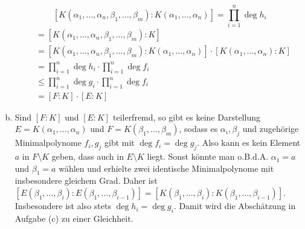 \documentclass{article}
\begin{document}
\begin{enumerate}[(a)]
\[            [K(\alpha_1,\dots, \alpha_n, \beta_1, \dots, \beta_m) \colon K(\alpha_1,\dots, \alpha_n)] = \prod_{i=1}^n \deg h_i
        \]
        \begin{align*}
            [EF \colon K] &= [K(\alpha_1,\dots, \alpha_n, \beta_1, \dots, \beta_m) \colon K]\\
            &= [K(\alpha_1,\dots, \alpha_n, \beta_1, \dots, \beta_m) \colon K(\alpha_1,\dots, \alpha_n)] \cdot [K(\alpha_1,\dots, \alpha_n):K]\\
            &=  \prod_{i=1}^n \deg h_i \cdot \prod_{i=1}^n \deg f_i\\
            &\leq \prod_{i=1}^n \deg g_i \cdot \prod_{i=1}^n \deg f_i\\
            &= [F:K] \cdot [E:K]
        \end{align*}
        \item Sind $[F:K]$ und $[E:K]$ teilerfremd, so gibt es keine Darstellung $E = K(\alpha_1, \dots, \alpha_n)$ und $F = K(\beta_1, \dots, \beta_m)$, sodass es $\alpha_i, \beta_j$ und zugehörige Minimalpolynome $f_i, g_j$ gibt mit $\deg f_i = \deg g_j$. Also kann es kein Element $a$ in $F \setminus K$ geben, dass auch in $E \setminus K$ liegt. Sonst könnte man o.B.d.A. $\alpha_1 = a$ und $\beta_1 = a$ wählen und erhielte zwei identische Minimalpolynome mit insbesondere gleichem Grad.
        Daher ist $[E(\beta_1, \dots, \beta_i) : E(\beta_1, \dots, \beta_{i-1})] = [K(\beta_1, \dots, \beta_i): K(\beta_1, \dots, \beta_{i-1})]$. Insbesondere ist also stets $\deg h_i = \deg g_i$. Damit wird die Abschätzung in Aufgabe (c) zu einer Gleichheit.
    \end{enumerate}
\end{document}
